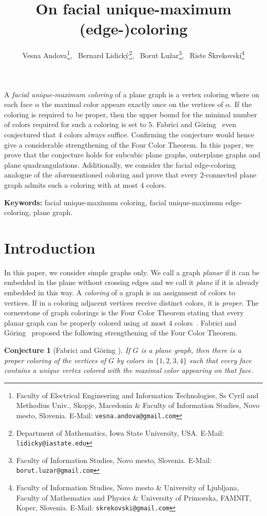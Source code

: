 \documentclass[a4paper,12pt]{article}
\title{On facial unique-maximum (edge-)coloring}
\author
{
	Vesna Andova\thanks{Faculty of Electrical Engineering and Information Technologies,
Ss Cyril and Methodius Univ., Skopje, Macedonia \& Faculty of Information Studies, Novo mesto, Slovenia.
		E-Mail: \texttt{vesna.andova@gmail.com}}, \
	Bernard Lidick\'y\thanks{Department of Mathematics, Iowa State University, USA.
		E-Mail: \texttt{lidicky@iastate.edu}}, \		
	Borut Lu\v{z}ar\thanks{Faculty of Information Studies, Novo mesto, Slovenia.
		E-Mail: \texttt{borut.luzar@gmail.com}}, \
  	Riste \v{S}krekovski\thanks{Faculty of Information Studies, Novo mesto
  		\& University of Ljubljana, Faculty of Mathematics and Physics
  		\& University of Primorska, FAMNIT, Koper, Slovenia.
   		E-Mail: \texttt{skrekovski@gmail.com}}		
}
\newtheorem{conjecture}{Conjecture}
\begin{document}
\maketitle

{
	\abstract
	{
		A \textit{facial unique-maximum coloring} of a plane graph is a vertex coloring where
		on each face $\alpha$ the maximal color appears exactly once on the vertices of $\alpha$.
		If the coloring is required to be proper, then the upper bound for the minimal number of colors required for such a coloring is set to $5$.
		Fabrici and G\"{o}ring~\cite{FabGor16} even conjectured that $4$ colors always suffice.
		Confirming the conjecture would hence give a considerable strengthening of the Four Color Theorem.
		In this paper, we prove that the conjecture holds for subcubic plane graphs, outerplane graphs and
		plane quadrangulations.
		Additionally, we consider the facial edge-coloring analogue of the aforementioned coloring and
		prove that every $2$-connected plane graph admits such a coloring with at most $4$ colors.
	}

	\bigskip
	{\noindent\small \textbf{Keywords:} facial unique-maximum coloring, facial unique-maximum edge-coloring, plane graph.}
}

\section{Introduction}

In this paper, we consider simple graphs only.
We call a graph \emph{planar} if it can be embedded in the plane without crossing edges
and we call it \emph{plane} if it is already embedded in this way.
A \emph{coloring} of a graph is an assignment of colors to vertices.
If in a coloring adjacent vertices receive distinct colors, it is \emph{proper}.
The cornerstone of graph colorings is the Four Color Theorem stating that every planar graph
can be properly colored using at most $4$ colors~\cite{AppHak76}.
Fabrici and G\"{o}ring~\cite{FabGor16} proposed the following strengthening of the Four Color Theorem.

\begin{conjecture}[Fabrici and G\"{o}ring \cite{FabGor16}]
	\label{conj:plane4}
	If $G$ is a plane graph, then there is a proper coloring of the vertices of $G$
	by colors in $\{1,2,3,4\}$ such that every face contains a unique vertex colored with
	the maximal color appearing on that face.
\end{conjecture}
\end{document}
